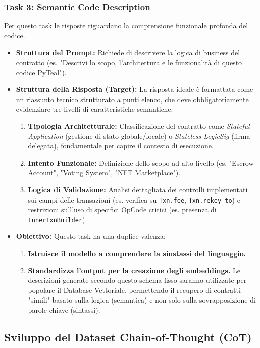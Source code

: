 \subsubsection{Task 3: Semantic Code Description}
Per questo task le risposte riguardano la comprensione funzionale profonda del codice.
\begin{itemize}
    \item \textbf{Struttura del Prompt:} Richiede di descrivere la logica di business del contratto (es. "Descrivi lo scopo, l'architettura e le funzionalità di questo codice PyTeal").
    \item \textbf{Struttura della Risposta (Target):} La risposta ideale è formattata come un riassunto tecnico strutturato a punti elenco, che deve obbligatoriamente evidenziare tre livelli di caratteristiche semantiche:
    \begin{enumerate}
        \item \textbf{Tipologia Architetturale:} Classificazione del contratto come \textit{Stateful Application} (gestione di stato globale/locale) o \textit{Stateless LogicSig} (firma delegata), fondamentale per capire il contesto di esecuzione.
        \item \textbf{Intento Funzionale:} Definizione dello scopo ad alto livello (es. "Escrow Account", "Voting System", "NFT Marketplace").
        \item \textbf{Logica di Validazione:} Analisi dettagliata dei controlli implementati sui campi delle transazioni (es. verifica su \texttt{Txn.fee}, \texttt{Txn.rekey\_to}) e restrizioni sull'uso di specifici OpCode critici (es. presenza di \texttt{InnerTxnBuilder}).
    \end{enumerate}
    \item \textbf{Obiettivo:} Questo task ha una duplice valenza:
    \begin{enumerate}
        \item \textbf{Istruisce il modello a comprendere la sinstassi del linguaggio.}
        \item \textbf{Standardizza l'output per la creazione degli embeddings.} Le descrizioni generate secondo questo schema fisso saranno utilizzate per popolare il Database Vettoriale, permettendo il recupero di contratti "simili" basato sulla logica (semantica) e non solo sulla sovrapposizione di parole chiave (sintassi).
    \end{enumerate}
\end{itemize}

\subsection{Sviluppo del Dataset Chain-of-Thought (CoT)}
\label{sec:cot_methodology}


